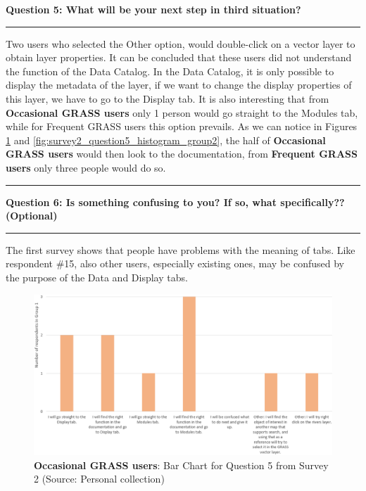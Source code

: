\documentclass[a4paper,10pt,twoside]{article}
\begin{document}
\newpage
\noindent \textbf{Question 5:  What will be your next step in third situation?}
\par\noindent\rule{\textwidth}{0.4pt}

\noindent Two users who selected the Other option, would double-click
on a vector layer to obtain layer properties. It can be concluded that
these users did not understand the function of the Data Catalog. In
the Data Catalog, it is only possible to display the metadata of the
layer, if we want to change the display properties of this layer, we
have to go to the Display tab. It is also interesting that from
\textbf{Occasional GRASS users} only 1 person would go straight to the
Modules tab, while for {Frequent GRASS users} this option prevails. As
we can notice in Figures \ref{fig:survey2_question5_histogram_group1}
and \ref{fig:survey2_question5_histogram_group2}, the half of
\textbf{Occasional GRASS users} would then look to the documentation,
from \textbf{Frequent GRASS users} only three people would do so.

\par\noindent\rule{\textwidth}{0.4pt}
\noindent \textbf{Question 6: Is something confusing to you? If so, what specifically?? (Optional)}
\par\noindent\rule{\textwidth}{0.4pt}

\noindent The first survey shows that people have problems with the
meaning of tabs. Like respondent \#15, also other users, especially
existing ones, may be confused by the purpose of the Data and Display
tabs.

\vspace{0.3cm}
\begin{figure}[hbt!] 
\begin{center}
\includegraphics[width=17cm]{../surveys/analyzed_data/survey2_question5_histogram_group1.png} 
\caption[\textbf{Occasional GRASS users}: Bar Chart for Question 5 from Survey 2]{\textbf{Occasional GRASS users}: Bar Chart for Question 5 from Survey 2 (Source: Personal collection)}
\label{fig:survey2_question5_histogram_group1}
\end{center}
\end{figure}
\end{document}
